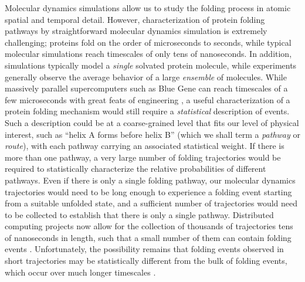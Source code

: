 Molecular dynamics simulations allow us to study the folding process in atomic spatial and temporal detail.
However, characterization of protein folding pathways by straightforward molecular dynamics simulation is extremely challenging; proteins fold on the order of microseconds to seconds, while typical molecular simulations reach timescales of only tens of nanoseconds.
In addition, simulations typically model a \emph{single} solvated protein molecule, while experiments generally observe the average behavior of a large \emph{ensemble} of molecules.
While massively parallel supercomputers such as Blue Gene \cite{gara:2005a} can reach timescales of a few microseconds with great feats of engineering \cite{fitch:2003a,germain:2005a}, a useful characterization of a protein folding mechanism would still require a \emph{statistical} description of events.
Such a description could be at a coarse-grained level that fits our level of physical interest, such as ``helix A forms before helix B'' (which we shall term a \emph{pathway} or \emph{route}), with each pathway carrying an associated statistical weight.
If there is more than one pathway, a very large number of folding trajectories would be required to statistically characterize the relative probabilities of different pathways.  
Even if there is only a single folding pathway, our molecular dynamics trajectories would need to be long enough to experience a folding event starting from a suitable unfolded state, and a sufficient number of trajectories would need to be collected to establish that there is only a single pathway.
Distributed computing projects now allow for the collection of thousands of trajectories tens of nanoseconds in length, such that a small number of them can contain folding events \cite{pande:2000a,zagrovic:2002a}.
Unfortunately, the possibility remains that folding events observed in short trajectories may be statistically different from the bulk of folding events, which occur over much longer timescales \cite{fersht:2002a,marianayagam:2005a}.  

